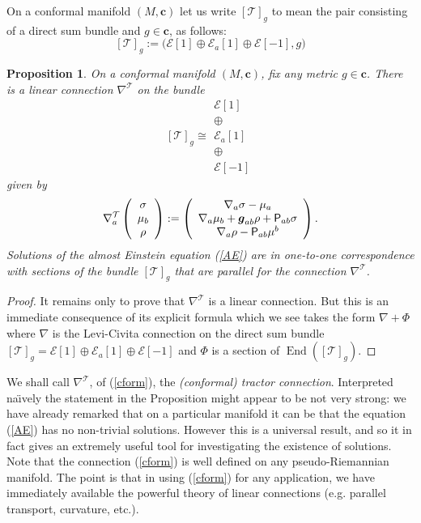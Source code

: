\documentclass[a4paper,12pt]{amsart}
\newcommand{\V}{\mbox{\sf P}}
\newcommand{\cc}{\boldsymbol{c}}
\newcommand{\cT}{{\mathcal T}}
\def\bg{\mbox{\boldmath $g$}}
\newcommand{\End}{\operatorname{End}}
\newtheorem{proposition}[theorem]{Proposition}
\theoremstyle{remark}
\newcommand{\nn}[1]{(\ref{#1})}
\begin{document}
On a conformal manifold $(M,\cc)$ let us write $\left[\mathcal{T}\right]_g$
to mean the pair consisting of a direct
sum bundle and $g\in \cc$, as follows: 
\begin{equation}\label{bform}
\left[\mathcal{T}\right]_g:=\big(
\mathcal{E}[1]\oplus\mathcal{E}_a[1]\oplus\mathcal{E}[-1], g \big)
\end{equation}
\begin{proposition}\label{tp} On a conformal manifold $(M,\cc)$, fix any metric
$g\in \cc$. There is a linear connection $\nabla^{\cT}$ on the bundle
$$
 \left[\mathcal{T}\right]_g \cong \begin{array}{c}
\mathcal{E}[1] \\ 
\oplus \\ 
\mathcal{E}_a[1] \\ 
\oplus\\ 
\mathcal{E}[-1]
\end{array} 
$$
given by 
\begin{equation}\label{cform}
\nabla_a^{\mathcal{T}} \left(\begin{array}{c}
\sigma \\ 
\mu_b \\ 
\rho
\end{array}\right):=\left(
\begin{array}{c}
\nabla_a\sigma -\mu_a \\ 
\nabla_a\mu_b+\bg_{ab}\rho+\V_{ab}\sigma\\ 
\nabla_a\rho-\V_{ab}\mu^b
\end{array} 
\right).
\end{equation}
Solutions of the almost Einstein equation \nn{AE} are in one-to-one
correspondence with sections of the bundle $ [{\cT}]_g$
that are parallel for the  connection $\nabla^\cT$. 
\end{proposition}
\begin{proof}
It remains only to prove that $\nabla^\cT$ is a linear connection. But this is
an immediate consequence of its explicit formula 
which we see takes the form $\nabla+\Phi$ where $\nabla$ is the Levi-Civita
connection on the direct sum bundle $\left[\mathcal{T}\right]_g =
\mathcal{E}[1] \oplus \mathcal{E}_a[1] \oplus \mathcal{E}[-1]$
and $\Phi$ is a section of $\End (\left[\mathcal{T}\right]_g) $.
\end{proof}

We shall call $\nabla^\cT$, of \nn{cform}, the {\em (conformal)
tractor connection}.  Interpreted na\"{\i}vely the statement in the
Proposition might appear to be not very strong: we have already
remarked that on a particular manifold it can be that the equation
\nn{AE} has no non-trivial solutions.  However this is a universal
result, and so it in fact gives an extremely useful tool for
investigating the existence of solutions. Note that the connection
\nn{cform} is well defined on any pseudo-Riemannian manifold. The
point is that in using \nn{cform} for any application, we have
immediately available the powerful theory of linear connections (e.g. parallel transport, curvature, etc.).
\end{document}
